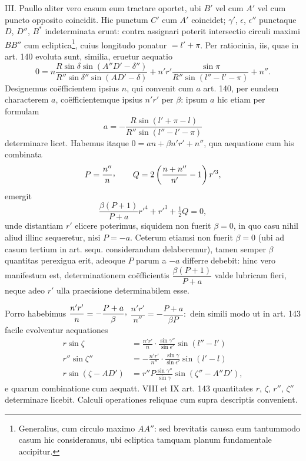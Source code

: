 III. Paullo aliter vero casum eum tractare oportet, ubi $B'$ vel cum $A'$ vel
cum puncto opposito coincidit. Hic punctum $C'$ cum $A'$ coincidet; $\gamma'$,
$\epsilon$, $\epsilon''$ punctaque $D$, $D''$, $B^*$ indeterminata erunt: contra
assignari poterit intersectio circuli maximi $BB''$ cum ecliptica\footnote{Generalius, cum circulo maximo $AA''$: sed brevitatis caussa eum tantummodo casum hic consideramus, ubi ecliptica tamquam planum fundamentale accipitur.},
cuius longitudo ponatur $=l'+\pi$. Per ratiocinia, iis, quae in art. 140 evoluta
sunt, similia, eruetur aequatio
\[
0=n\frac{R\sin\delta\sin(A''D'-\delta'')}{R''\sin\delta''\sin(AD'-\delta)}
+n'r'\frac{\sin\pi}{R''\sin(l''-l'-\pi)}+n''.
\]
Designemus coëfficientem ipsius $n$, qui convenit cum $a$ art. 140, per eundem
characterem $a$, coëfficientemque ipsius $n'r'$ per $\beta$: ipsum $a$
hic etiam per formulam
\[
a=-\frac{R\sin(l'+\pi-l)}{R''\sin(l''-l'-\pi)}
\]
determinare licet. Habemus itaque $0=an+\beta n'r'+n''$, qua aequatione cum his combinata
\[
P=\frac{n''}{n}\mathpunct{\raisebox{.45ex}{,}}\qquad
Q=2\left(\frac{n+n''}{n'}-1\right)r'^3,
\]
emergit
\[
\frac{\beta(P+1)}{P+a}r'^4+r'^3+\tfrac12Q=0,
\]
unde distantiam $r'$ elicere poterimus, siquidem non fuerit $\beta=0$, in quo
casu nihil aliud illinc sequeretur, nisi $P=-a$. Ceterum etiamsi non fuerit
$\beta=0$ (ubi ad casum tertium in art. sequ. considerandum delaberemur), tamen
semper $\beta$ quantitas perexigua erit, adeoque $P$ parum a $-a$ differre
debebit: hinc vero manifestum est, determinationem coëfficientis
$\dfrac{\beta(P+1)}{P+a}$ valde lubricam fieri, neque adeo $r'$ ulla praecisione
determinabilem esse.

Porro habebimus $\dfrac{n'r'}{n}=-\dfrac{P+a}{\beta}\mathpunct{\raisebox{.45ex}{,}}$
$\dfrac{n'r'}{n''}=-\dfrac{P+a}{\beta P}\mathpunct{:}$ dein simili modo ut in
art. 143 facile evolventur aequationes
\[
\begin{aligned}
r\sin\zeta&=\frac{n'r'}{n}\cdot\frac{\sin\gamma''}{\sin\epsilon'}\sin(l''-l')\\[.5em]
r''\sin\zeta''&=-\frac{n'r'}{n''}\cdot\frac{\sin\gamma}{\sin\epsilon'}\sin(l'-l)\\[.5em]
r\sin(\zeta-AD')&=r''P\frac{\sin\gamma''}{\sin\gamma}\sin(\zeta''-A''D'),
\end{aligned}
\]
e quarum combinatione cum aequatt. VIII et IX art. 143 quantitates $r$, $\zeta$,
$r''$, $\zeta''$ determinare licebit. Calculi operationes reliquae cum supra
descriptis convenient.
